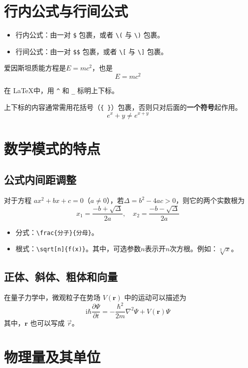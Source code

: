 \documentclass[12pt]{article}
\begin{document}
\section{行内公式与行间公式}
\begin{itemize}
    \item 行内公式：由一对 \verb|$| 包裹，或者 \verb|\(| 与 \verb|\)| 包裹。
    \item 行间公式：由一对 \verb|$$| 包裹，或者 \verb|\[| 与 \verb|\]| 包裹。
\end{itemize}

爱因斯坦质能方程是$E=mc^2$，也是
\[
    E=mc^2
\]

在 \LaTeX 中，用 \verb|^| 和 \verb|_| 标明上下标。

上下标的内容通常需用花括号（\verb|{ }|）包裹，否则只对后面的\textbf{一个符号}起作用。
\[
    e^x+y \neq e^{x+y}
\]

\section{数学模式的特点}

\subsection{公式内间距调整}

对于方程 $ax^2+bx+c=0$（$a \neq 0$），若$\Delta=b^2-4ac > 0$，则它的两个实数根为
\[
    x_1 = \frac{-b+\sqrt{\Delta}}{2a}, \quad x_2 = \frac{-b-\sqrt{\Delta}}{2a}
\]

\begin{itemize}
    \item 分式：\verb|\frac{分子}{分母}|。
    \item 根式：\verb|\sqrt[n]{f(x)}|。其中，可选参数$n$表示开$n$次方根。例如：\(\sqrt[3]{x}\)。
\end{itemize}

\subsection{正体、斜体、粗体和向量}
在量子力学中，微观粒子在势场 \(V(\mathbf{r})\) 中的运动可以描述为
\[
    \mathrm{i} \hbar \frac{\partial \Psi}{\partial t} = 
    - \frac{\hbar^2}{2m} \nabla^2 \Psi + V(\mathbf{r}) \Psi
\]
其中，\(\mathbf{r}\) 也可以写成 \(\vec{r}\)。

\section{物理量及其单位}
\end{document}
